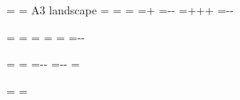 %
\ifdefined\EndleafPaper\else{}\fi
\def\EndleafPageAthree{A3}
\def\EndleafPageLandscape{landscape}
\newif\ifEndleafPageResize
\newif\ifEndleafPageLand
\newdimen\EndleafLandL
\newdimen\EndleafLandR
\newdimen\EndleafLandT
\newdimen\EndleafLandB
\EndleafLandL=20mm
\EndleafLandR=20mm
\EndleafLandT=20mm
\EndleafLandB=22mm
\newdimen\EndleafPageW
\newdimen\EndleafPageH
\newdimen\EndleafPageL
\newdimen\EndleafPageR
\newdimen\EndleafPageT
\newdimen\EndleafPageB
\EndleafPageW=\paperwidth
\EndleafPageH=\paperheight
\ifx\EndleafPaper\EndleafPageAthree
  \EndleafPageW=297mm
  \EndleafPageH=420mm
  \EndleafPageResizetrue
\fi
\ifdefined\EndleafOrientation
  \ifx\EndleafOrientation\EndleafPageLandscape
    \EndleafPageL=\EndleafPageW
    \EndleafPageW=\EndleafPageH
    \EndleafPageH=\EndleafPageL
    \EndleafPageResizetrue
    \EndleafPageLandtrue
  \fi
\fi
\EndleafPageL=\dimexpr 1in+\oddsidemargin\relax
\EndleafPageR=\dimexpr\paperwidth-\EndleafPageL-\textwidth\relax
\EndleafPageT=\dimexpr 1in+\topmargin+\headheight+\headsep\relax
\EndleafPageB=\dimexpr\paperheight-\EndleafPageT-\textheight\relax
\ifEndleafPageLand
  \EndleafPageL=\EndleafLandL
  \EndleafPageR=\EndleafLandR
  \EndleafPageT=\EndleafLandT
  \EndleafPageB=\EndleafLandB
  \oddsidemargin=\dimexpr\EndleafPageL-1in\relax
  \topmargin=\dimexpr\EndleafPageT-1in-\headheight-\headsep\relax
\fi
\ifEndleafPageResize
  \paperwidth=\EndleafPageW
  \paperheight=\EndleafPageH
  \textwidth=\dimexpr\paperwidth-\EndleafPageL-\EndleafPageR\relax
  \textheight=\dimexpr\paperheight-\EndleafPageT-\EndleafPageB\relax
  \evensidemargin=\oddsidemargin
\fi
\ifdefined\pdfpagewidth
  \pdfpagewidth=\paperwidth
  \pdfpageheight=\paperheight
\fi
